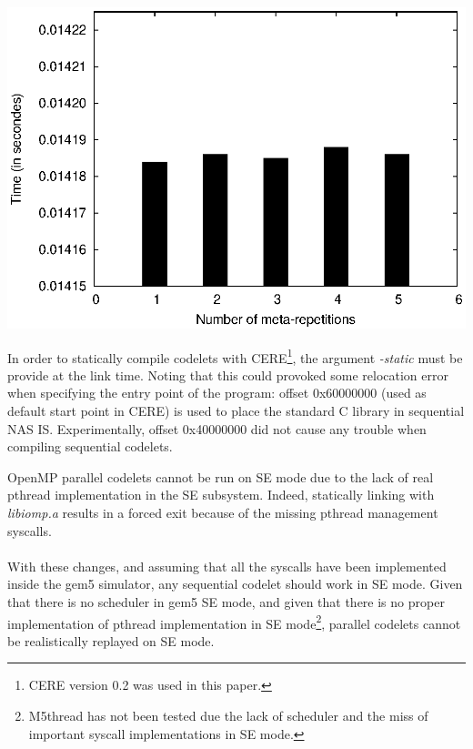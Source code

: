 \documentclass{article}
\newenvironment{Figure}
  {\par\medskip\noindent\center\minipage{0.9\linewidth}}
  {\endminipage\par\bigskip\medskip}
\begin{document}
\begin{multicols}{2}
\begin{Figure}
\centering
\includegraphics[width=\linewidth]{vari_se.eps}
\end{Figure}


In order to statically compile codelets with CERE\footnote{CERE version 0.2 was used in this paper.}, the argument \textit{-static} must be provide at the link time. Noting that this could provoked some relocation error when specifying the entry point of the program: offset 0x60000000 (used as default start point in CERE) is used to place the standard C library in sequential NAS IS. Experimentally, offset 0x40000000 did not cause any trouble when compiling sequential codelets. 


OpenMP parallel codelets cannot be run on SE mode due to the lack of real pthread implementation in the SE subsystem. Indeed, statically linking with \textit{libiomp.a} results in a forced exit because of the missing pthread management syscalls.

\paragraph{}
With these changes, and assuming that all the syscalls have been implemented inside the gem5 simulator, any sequential codelet should work in SE mode. Given that there is no scheduler in gem5 SE mode, and given that there is no proper implementation of pthread implementation in SE mode\footnote{M5thread has not been tested due the lack of scheduler and the miss of important syscall implementations in SE mode.}, parallel codelets cannot be realistically replayed on SE mode.


\end{multicols}
\end{document}
